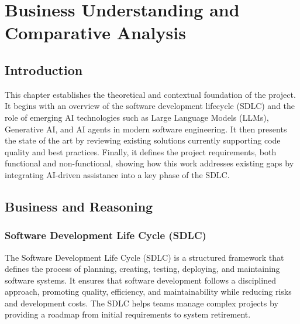 
\setcounter{chapter}{1}
\chapter{Business Understanding and Comparative
Analysis}
\minitoc %
\graphicspath{{Chapitre2/figures/}}


\pagestyle{fancy}
\fancyhf{}
\fancyhead[R]{\bfseries\rightmark}
\fancyfoot[R]{\thepage}
\renewcommand{\headrulewidth}{0.5pt}
\renewcommand{\footrulewidth}{0pt}
\renewcommand{\chaptermark}[1]{\markboth{\MakeUppercase{\chaptername~\thechapter. #1 }}{}}
\renewcommand{\sectionmark}[1]{\markright{\thechapter.\thesection~ #1}}

\begin{spacing}{1.2}

\section*{Introduction}
This chapter establishes the theoretical and contextual foundation of the project. It begins with an overview of the software development lifecycle (SDLC) and the role of emerging AI technologies such as Large Language Models (LLMs), Generative AI, and AI agents in modern software engineering. It then presents the state of the art by reviewing existing solutions currently supporting code quality and best practices. Finally, it defines the project requirements, both functional and non-functional, showing how this work addresses existing gaps by integrating AI-driven assistance into a key phase of the SDLC.  

\section{Business and Reasoning}

\subsection{Software Development Life Cycle (SDLC)}

The Software Development Life Cycle (SDLC) is a structured framework that defines the process of planning, creating, testing, deploying, and maintaining software systems. It ensures that software development follows a disciplined approach, promoting quality, efficiency, and maintainability while reducing risks and development costs. The SDLC helps teams manage complex projects by providing a roadmap from initial requirements to system retirement.  


\end{spacing}
